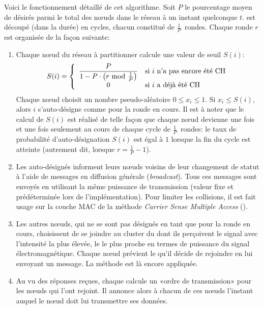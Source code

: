 Voici le fonctionnement détaillé de cet algorithme.
Soit $P$ le pourcentage moyen de \CHs désirés parmi le total des nœuds dans le réseau à un instant quelconque $t$.
\leach est découpé (dans la durée) en cycles, chacun constitué de $\frac{1}{P}$~rondes.
Chaque ronde $r$ est organisée de la façon suivante:
\begin{enumerate}
    \item Chaque nœud du réseau à partitionner calcule une valeur de seuil $S(i)$:
        \[
            S(i) = \left\{
            \begin{array}{cl}
                \displaystyle \frac{P}{1-P\cdot\left(r\mbox{ mod }\frac{1}{P}\right)} & \mbox{si }i\mbox{ n'a pas encore été \CH}\\
                                                                     0 & \mbox{si }i\mbox{ a déjà été \CH}
            \end{array}
            \right.
        \]
        Chaque nœud choisit un nombre pseudo-aléatoire $0 \le x_{i}\le 1$.
        Si $x_{i} \le S(i)$, alors $i$ s'auto-désigne comme \CH pour la ronde en cours.
        Il est à noter que le calcul de $S(i)$ est réalisé de telle façon que chaque nœud devienne \ch une fois et une fois seulement au cours de chaque cycle de $\frac{1}{P}$~rondes: le taux de probabilité d'auto-désignation $S(i)$ est égal à $1$ lorsque la fin du cycle est atteinte (autrement dit, lorsque $r = \frac{1}{P}-1$).
    \item Les \CHs auto-désignés informent leurs nœuds voisins de leur changement de statut à l'aide de messages en diffusion générale (\textit{broadcast}).
        Tous ces messages sont envoyés en utilisant la même puissance de transmission (valeur fixe et prédéterminée lors de l'implémentation).
        Pour limiter les collisions, il est fait usage sur la couche MAC de la méthode \textit{Carrier Sense Multiple Access} (\csma).
    \item Les autres nœuds, qui ne se sont pas désignés en tant que \chs pour la ronde en cours, choisissent de se joindre au cluster du \CH dont ils perçoivent le signal avec l'intensité la plus élevée, \cad le \CH le plus proche en termes de puissance du signal électromagnétique.
        Chaque nœud prévient le \ch qu'il décide de rejoindre en lui envoyant un message.
        La méthode \csma est là encore appliquée.
    \item Au vu des réponses reçues, chaque \ch calcule un «ordre de transmission» pour les nœuds qui l'ont rejoint.
        Il annonce alors à chacun de ces nœuds l'instant auquel le nœud doit lui transmettre ses données.

\end{enumerate}

